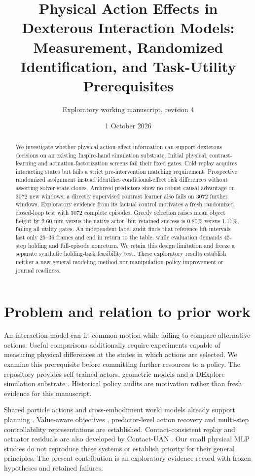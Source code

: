 \documentclass[10pt]{article}
\title{Physical Action Effects in Dexterous Interaction Models:\\Measurement, Randomized Identification, and Task-Utility Prerequisites}
\author{Exploratory working manuscript, revision 4}
\date{1 October 2026}
\begin{document}
\maketitle
\begin{abstract}
We investigate whether physical action-effect information can support dexterous
decisions on an existing Inspire-hand simulation substrate. Initial physical,
contrast-learning and actuation-factorization screens fail their fixed gates.
Cold replay acquires interacting states but fails a strict pre-intervention
matching requirement. Prospective randomized assignment instead identifies
conditional-effect risk differences without asserting solver-state clones.
Archived predictors show no robust causal advantage on 3072 new windows; a
directly supervised contrast learner also fails on 3072 further windows.
Exploratory evidence from its factual control motivates a fresh randomized
closed-loop test with 3072 complete episodes. Greedy selection raises mean
object height by 2.60 mm versus the native actor, but retained success is
0.80\% versus 1.17\%, failing all utility gates. An independent label audit
finds that reference lift intervals last only 25--36 frames and end in return
to the table, while evaluation demands 45-step holding and full-episode nonreturn.
We retain this design limitation and freeze a separate synthetic holding-task
feasibility test. These exploratory results establish neither a new general
modeling method nor manipulation-policy improvement or journal readiness.
\end{abstract}

\section{Problem and relation to prior work}
An interaction model can fit common motion while failing to compare alternative actions.
Useful comparisons additionally require experiments capable of measuring physical
differences at the states in which actions are selected. We examine this prerequisite
before committing further resources to a policy. The repository provides self-trained
actors, geometric models and a DExplore simulation substrate \cite{xu2025}. Historical
policy audits are motivation rather than fresh evidence for this manuscript.

Shared particle actions and cross-embodiment world models already support planning
\cite{he2025}. Value-aware objectives \cite{farahmand2017}, predictor-level action
recovery \cite{qiu2026} and multi-step controllability representations \cite{rudolph2024}
are established. Contact-consistent replay and actuator residuals are also developed
by Contact-UAN \cite{fey2026}. Our small physical MLP studies do not reproduce these
systems or establish priority for their general principles. The present contribution
is an exploratory evidence record with frozen hypotheses and retained failures.
\end{document}
